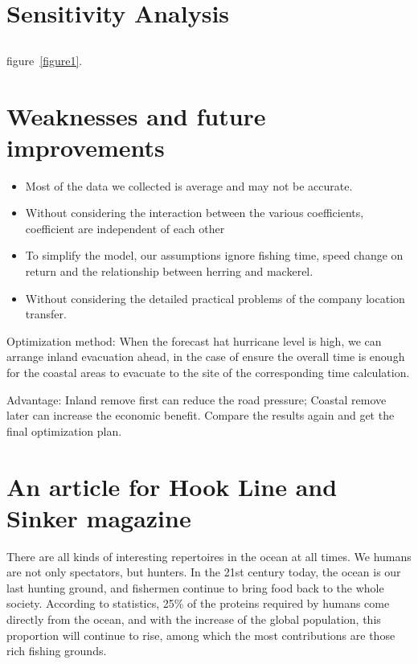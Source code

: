 \documentclass{mcmthesis}
\begin{document}
\section{Sensitivity Analysis}
\subsection{}

figure~\ref{figure1}.

\section{Weaknesses and future improvements}

\begin{itemize}
  \item Most of the data we collected is average and may not be accurate.
   \item Without considering the interaction between the various coefficients, coefficient  are independent of each other
   \item To simplify the model, our assumptions ignore fishing time, speed change on return and the relationship between herring and mackerel.
     \item Without considering the detailed practical problems of the company location transfer.

\end{itemize}

Optimization method: When the forecast hat hurricane level is high, we can arrange inland evacuation ahead, in the case of ensure the overall time is enough for the coastal areas to evacuate to the site of the corresponding time calculation.

Advantage: Inland remove first can reduce the road pressure; Coastal remove later can increase the economic benefit. Compare the results again and get the final optimization plan.


\section{An article for Hook Line and Sinker magazine}
There are all kinds of interesting repertoires in the ocean at all times. We humans are not only spectators, but hunters. In the 21st century today, the ocean is our last hunting ground, and fishermen continue to bring food back to the whole society. According to statistics, 25\% of the proteins required by humans come directly from the ocean, and with the increase of the global population, this proportion will continue to rise, among which the most contributions are those rich fishing grounds.
\end{document}
